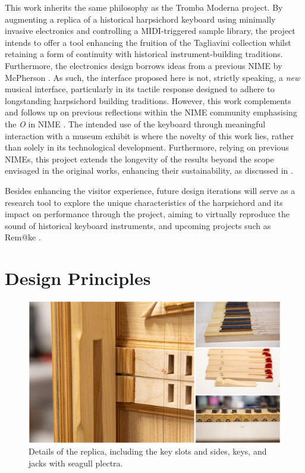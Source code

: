 This work inherits the same philosophy as the Tromba Moderna project. By augmenting a replica of a historical harpsichord keyboard using minimally invasive electronics and controlling a MIDI-triggered sample library, the project intends to offer a tool enhancing the fruition of the Tagliavini collection whilst retaining a form of continuity with historical instrument-building traditions. Furthermore, the electronics design borrows ideas from a previous NIME by McPherson \cite{McPherson2013}. As such, the interface proposed here is not, strictly speaking, a \emph{new} musical interface, particularly in its tactile response designed to adhere to longstanding harpsichord building traditions. However, this work complements and follows up on previous reflections within the NIME community emphasising the \emph{O} in NIME \cite{Masu_NIME_2023}. 
The intended use of the keyboard through meaningful interaction with a museum exhibit is where the novelty of this work lies, rather than solely in its technological development. Furthermore, relying on previous NIMEs, this project extends the longevity of the results beyond the scope envisaged in the original works, enhancing their sustainability, as discussed in \cite{Masu_NIME_2023}.

Besides enhancing the visitor experience, future design iterations will serve as a research tool to explore the unique characteristics of the harpsichord and its impact on performance through the  project, aiming to virtually reproduce the sound of historical keyboard instruments, and upcoming projects such as Rem@ke \cite{remake1}.

\section{Design Principles}\label{design}

\begin{figure}
\includegraphics[width=\linewidth]{src/images/details.jpg}
\caption{Details of the replica, including the key slots and sides, keys, and jacks with seagull plectra.}\label{fig:details}
\end{figure}


